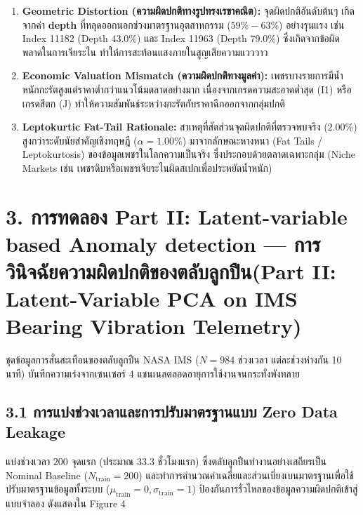 \documentclass[12pt,a4paper]{article}
\newcommand{\codevar}[1]{\textcolor{codeaccent}{\textbf{#1}}}
\begin{document}
\begin{infobox}[title=\textbf{ข้อค้นพบสำคัญจากการทดลอง Part I (Key Findings \& Physical Insights)}]
\begin{enumerate}[leftmargin=1.5em, itemsep=1.5pt]
    \item \textbf{Geometric Distortion (ความผิดปกติทางรูปทรงเรขาคณิต):} จุดผิดปกติอันดับต้นๆ เกิดจากค่า \codevar{depth} ที่หลุดออกนอกช่วงมาตรฐานอุตสาหกรรม ($59\% - 63\%$) อย่างรุนแรง เช่น Index 11182 (Depth $43.0\%$) และ Index 11963 (Depth $79.0\%$) ซึ่งเกิดจากข้อผิดพลาดในการเจียระไน ทำให้การสะท้อนแสงภายในสูญเสียความแวววาว
    \item \textbf{Economic Valuation Mismatch (ความผิดปกติทางมูลค่า):} เพชรบางรายการมีน้ำหนักกะรัตสูงแต่ราคาต่ำกว่าแนวโน้มตลาดอย่างมาก เนื่องจากเกรดความสะอาดต่ำสุด (I1) หรือเกรดสีตก (J) ทำให้ความสัมพันธ์ระหว่างกะรัตกับราคาฉีกออกจากกลุ่มปกติ
    \item \textbf{Leptokurtic Fat-Tail Rationale:} สาเหตุที่สัดส่วนจุดผิดปกติที่ตรวจพบจริง ($2.00\%$) สูงกว่าระดับนัยสำคัญเชิงทฤษฎี ($\alpha = 1.00\%$) มาจากลักษณะหางหนา (Fat Tails / Leptokurtosis) ของข้อมูลเพชรในโลกความเป็นจริง ซึ่งประกอบด้วยตลาดเฉพาะกลุ่ม (Niche Markets เช่น เพชรดิบหรือเพชรเจียระไนผิดสเปกเพื่อประหยัดน้ำหนัก)
\end{enumerate}
\end{infobox}

\clearpage
\section*{3. การทดลอง \textcolor{partdarkorange}{Part II: Latent-variable based Anomaly detection} — การวินิจฉัยความผิดปกติของตลับลูกปืน\newline \large(\textcolor{partdarkorange}{Part II: Latent-Variable PCA on IMS Bearing Vibration Telemetry})}

ชุดข้อมูลการสั่นสะเทือนของตลับลูกปืน NASA IMS ($N=984$ ช่วงเวลา แต่ละช่วงห่างกัน 10 นาที) บันทึกความเร่งจากเซนเซอร์ 4 แชนเนลตลอดอายุการใช้งานจนกระทั่งพังทลาย

\subsection*{3.1 การแบ่งช่วงเวลาและการปรับมาตรฐานแบบ Zero Data Leakage}
แบ่งช่วงเวลา $200$ จุดแรก (ประมาณ 33.3 ชั่วโมงแรก) ซึ่งตลับลูกปืนทำงานอย่างเสถียรเป็น Nominal Baseline ($N_{\text{train}} = 200$) และทำการคำนวณค่าเฉลี่ยและส่วนเบี่ยงเบนมาตรฐานเพื่อใช้ปรับมาตรฐานข้อมูลทั้งระบบ ($\mu_{\text{train}} = 0, \sigma_{\text{train}} = 1$) ป้องกันการรั่วไหลของข้อมูลความผิดปกติเข้าสู่แบบจำลอง ดังแสดงใน Figure 4
\end{document}

